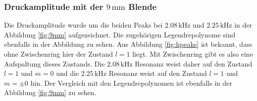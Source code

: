 \subsubsection{Druckamplitude mit der $9 \,\si{\milli\metre}$ Blende}
Die Druckamplitude wurde um die beiden Peaks bei $2.08 \,\si{\kilo\hertz}$ und $2.25 \,\si{\kilo\hertz}$ in der Abbildung \ref{fig:9mm} aufgezeichnet. Die zugehörigen Legendrepolynome sind ebenfalls in der Abbildung zu sehen. Aus Abbildung \ref{fig:hpeaks} ist bekannt, dass ohne Zwischenring hier der Zustand $l=1$ liegt. Mit Zwischenring gibt es also eine Aufspaltung dieses Zustands. 
Die $2.08 \,\si{\kilo\hertz}$ Resonanz weist daher auf den Zustand $l=1$ und $m=0$ und die $2.25 \,\si{\kilo\hertz}$ Resonanz weist auf den Zustand $l=1$ und $m=\pm 0$ hin. Der Vergleich mit den Legendrepolynomen ist ebenfalls in der Abbildung \ref{fig:9mm} zu sehen. 
